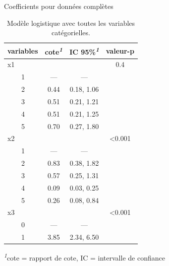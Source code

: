 \documentclass[
  ignorenonframetext,
]{beamer}
\begin{document}
\begin{frame}{Coefficients pour données complètes}
\protect\hypertarget{coefficients-pour-donnuxe9es-compluxe8tes}{}
\footnotesize

\hypertarget{tbl-logit1-complet}{}
\setlength{\LTpost}{0mm}
\begin{longtable}{lccc}
\caption{\label{tbl-logit1-complet}Modèle logistique avec toutes les variables catégorielles. }\tabularnewline

\toprule
variables & cote\textsuperscript{\textit{1}} & IC 95\%\textsuperscript{\textit{1}} & valeur-p \\ 
\midrule
x1 &  &  & 0.4 \\ 
    1 & — & — &  \\ 
    2 & 0.44 & 0.18, 1.06 &  \\ 
    3 & 0.51 & 0.21, 1.21 &  \\ 
    4 & 0.51 & 0.21, 1.25 &  \\ 
    5 & 0.70 & 0.27, 1.80 &  \\ 
x2 &  &  & <0.001 \\ 
    1 & — & — &  \\ 
    2 & 0.83 & 0.38, 1.82 &  \\ 
    3 & 0.57 & 0.25, 1.31 &  \\ 
    4 & 0.09 & 0.03, 0.25 &  \\ 
    5 & 0.26 & 0.08, 0.84 &  \\ 
x3 &  &  & <0.001 \\ 
    0 & — & — &  \\ 
    1 & 3.85 & 2.34, 6.50 &  \\ 
\bottomrule
\end{longtable}
\begin{minipage}{\linewidth}
\textsuperscript{\textit{1}}cote = rapport de cote, IC = intervalle de confiance\\
\end{minipage}

\normalsize
\end{frame}
\end{document}

